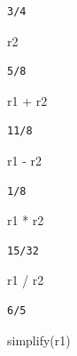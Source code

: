 \documentclass[
  12pt,
]{article}
\newenvironment{Shaded}{\begin{snugshade}}{\end{snugshade}}
\newcommand{\FunctionTok}[1]{\textcolor[rgb]{0.28,0.35,0.67}{#1}}
\newcommand{\NormalTok}[1]{\textcolor[rgb]{0.00,0.23,0.31}{#1}}
\newcommand{\SpecialCharTok}[1]{\textcolor[rgb]{0.37,0.37,0.37}{#1}}
\begin{document}
\begin{verbatim}
3/4
\end{verbatim}

\begin{Shaded}
\begin{Highlighting}[]
\NormalTok{r2}
\end{Highlighting}
\end{Shaded}

\begin{verbatim}
5/8
\end{verbatim}

\begin{Shaded}
\begin{Highlighting}[]
\NormalTok{r1 }\SpecialCharTok{+}\NormalTok{ r2}
\end{Highlighting}
\end{Shaded}

\begin{verbatim}
11/8
\end{verbatim}

\begin{Shaded}
\begin{Highlighting}[]
\NormalTok{r1 }\SpecialCharTok{{-}}\NormalTok{ r2}
\end{Highlighting}
\end{Shaded}

\begin{verbatim}
1/8
\end{verbatim}

\begin{Shaded}
\begin{Highlighting}[]
\NormalTok{r1 }\SpecialCharTok{*}\NormalTok{ r2}
\end{Highlighting}
\end{Shaded}

\begin{verbatim}
15/32
\end{verbatim}

\begin{Shaded}
\begin{Highlighting}[]
\NormalTok{r1 }\SpecialCharTok{/}\NormalTok{ r2}
\end{Highlighting}
\end{Shaded}

\begin{verbatim}
6/5
\end{verbatim}

\begin{Shaded}
\begin{Highlighting}[]
\FunctionTok{simplify}\NormalTok{(r1)}
\end{Highlighting}
\end{Shaded}
\end{document}

